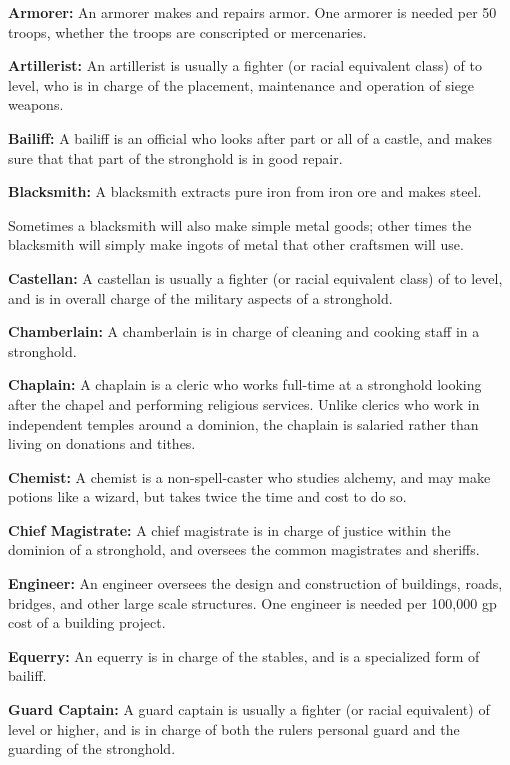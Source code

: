 \begin{multicols*}{2}
\textbf{Armorer:} An armorer makes and repairs armor. One armorer is needed per 50 troops, whether the troops are conscripted or mercenaries.

\textbf{Artillerist:} An artillerist is usually a fighter (or racial equivalent class) of  to  level, who is in charge of the placement, maintenance and operation of siege weapons.

\textbf{Bailiff:} A bailiff is an official who looks after part or all of a castle, and makes sure that that part of the stronghold is in good repair.

\textbf{Blacksmith:} A blacksmith extracts pure iron from iron ore and makes steel.

Sometimes a blacksmith will also make simple metal goods; other times the blacksmith will simply make ingots of metal that other craftsmen will use.

\textbf{Castellan:} A castellan is usually a fighter (or racial equivalent class) of  to  level, and is in overall charge of the military aspects of a stronghold.

\textbf{Chamberlain:} A chamberlain is in charge of cleaning and cooking staff in a stronghold.

\textbf{Chaplain:} A chaplain is a cleric who works full-time at a stronghold looking after the chapel and performing religious services. Unlike clerics who work in independent temples around a dominion, the chaplain is salaried rather than living on donations and tithes.

\textbf{Chemist:} A chemist is a non-spell-caster who studies alchemy, and may make potions like a wizard, but takes twice the time and cost to do so.

\textbf{Chief Magistrate:} A chief magistrate is in charge of justice within the dominion of a stronghold, and oversees the common magistrates and sheriffs.

\textbf{Engineer:} An engineer oversees the design and construction of buildings, roads, bridges, and other large scale structures. One engineer is needed per 100,000 gp cost of a building project.

\textbf{Equerry:} An equerry is in charge of the stables, and is a specialized form of bailiff.

\textbf{Guard Captain:} A guard captain is usually a fighter (or racial equivalent) of  level or higher, and is in charge of both the rulers personal guard and the guarding of the stronghold.


\end{multicols*}
